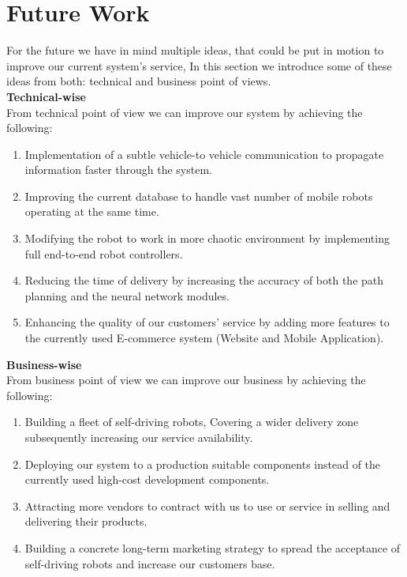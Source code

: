 \section{Future Work}
\hspace{2cm}For the future we have in mind multiple ideas, that could be put in motion to improve our current system's service, In this section we introduce some of these ideas from both: technical and business point of views.\\
\textbf{Technical-wise}\\
From technical point of view we can improve our system by achieving the following:
\begin{enumerate}
    \item Implementation of a subtle vehicle-to vehicle communication to propagate information faster through the system.
    \item Improving the current database to handle vast number of mobile robots operating at the same time.
    \item Modifying the robot to work in more chaotic environment by implementing full end-to-end robot 
    controllers. 
    \item Reducing the time of delivery by increasing the accuracy of both the path planning and the neural network modules.
    \item Enhancing the quality of our customers' service by adding more features to the currently used E-commerce system (Website and Mobile Application).
\end{enumerate}
\newpage
\textbf{Business-wise}\\
From business point of view we can improve our business by achieving the following:
\begin{enumerate}
    \item Building a fleet of self-driving robots, Covering a wider delivery zone subsequently increasing our service availability.
    \item Deploying our system to a production suitable components instead of the currently used high-cost development components. 
    \item Attracting more vendors to contract with us to use or service in selling and delivering their products. 
    \item Building a concrete long-term marketing strategy to spread the acceptance of self-driving robots and increase our customers base.
\end{enumerate}